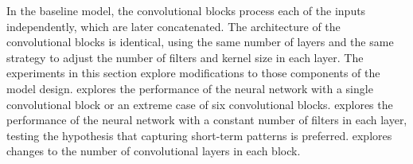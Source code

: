 
In the baseline model, the convolutional blocks process each
of the inputs independently, which are later concatenated.
The architecture of the convolutional blocks is identical,
using the same number of layers and the same strategy to
adjust the number of filters and kernel size in each layer.
The experiments in this section explore modifications to
those components of the model design.
 explores the
performance of the neural network with a single
convolutional block or an extreme case of six convolutional
blocks.  explores the
performance of the neural network with a constant number of
filters in each layer, testing the hypothesis that capturing
short-term patterns is preferred.
 explores changes
to the number of convolutional layers in each block. 
